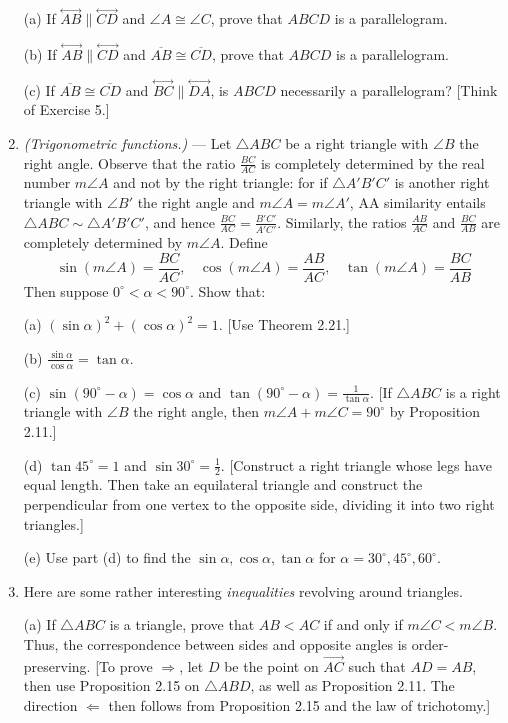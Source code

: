 \documentclass[leqno]{book}
\begin{document}
\begin{enumerate}
(a) If $\overset{\longleftrightarrow}{AB}\parallel\overset{\longleftrightarrow}{CD}$ and $\angle A\cong\angle C$, prove that $ABCD$ is a parallelogram.

(b) If $\overset{\longleftrightarrow}{AB}\parallel\overset{\longleftrightarrow}{CD}$ and $\overline{AB}\cong\overline{CD}$, prove that $ABCD$ is a parallelogram.

(c) If $\overline{AB}\cong\overline{CD}$ and $\overset{\longleftrightarrow}{BC}\parallel\overset{\longleftrightarrow}{DA}$, is $ABCD$ necessarily a parallelogram?  [Think of Exercise 5.]

\item\emph{(Trigonometric functions.)} \---- Let $\triangle ABC$ be a right triangle with $\angle B$ the right angle.  Observe that the ratio $\frac{BC}{AC}$ is completely determined by the real number $m\angle A$ and not by the right triangle: for if $\triangle A'B'C'$ is another right triangle with $\angle B'$ the right angle and $m\angle A=m\angle A'$, AA similarity entails $\triangle ABC\sim\triangle A'B'C'$, and hence $\frac{BC}{AC}=\frac{B'C'}{A'C'}$.  Similarly, the ratios $\frac{AB}{AC}$ and $\frac{BC}{AB}$ are completely determined by $m\angle A$.  Define
$$\sin(m\angle A)=\frac{BC}{AC},~~~~\cos(m\angle A)=\frac{AB}{AC},~~~~\tan(m\angle A)=\frac{BC}{AB}$$
Then suppose $0^\circ<\alpha<90^\circ$.  Show that:

(a) $(\sin\alpha)^2+(\cos\alpha)^2=1$.  [Use Theorem 2.21.]

(b) $\frac{\sin\alpha}{\cos\alpha}=\tan\alpha$.

(c) $\sin(90^\circ-\alpha)=\cos\alpha$ and $\tan(90^\circ-\alpha)=\frac 1{\tan\alpha}$.  [If $\triangle ABC$ is a right triangle with $\angle B$ the right angle, then $m\angle A+m\angle C=90^\circ$ by Proposition 2.11.]

(d) $\tan 45^\circ=1$ and $\sin 30^\circ=\frac 12$.  [Construct a right triangle whose legs have equal length.  Then take an equilateral triangle and construct the perpendicular from one vertex to the opposite side, dividing it into two right triangles.]

(e) Use part (d) to find the $\sin\alpha,\cos\alpha,\tan\alpha$ for $\alpha=30^\circ,45^\circ,60^\circ$.

\item Here are some rather interesting \emph{inequalities} revolving around triangles.

(a) If $\triangle ABC$ is a triangle, prove that $AB<AC$ if and only if $m\angle C<m\angle B$.  Thus, the correspondence between sides and opposite angles is order-preserving.  [To prove $\Rightarrow$, let $D$ be the point on $\overset{\longrightarrow}{AC}$ such that $AD=AB$, then use Proposition 2.15 on $\triangle ABD$, as well as Proposition 2.11.  The direction $\Leftarrow$ then follows from Proposition 2.15 and the law of trichotomy.]


\end{enumerate}
\end{document}
